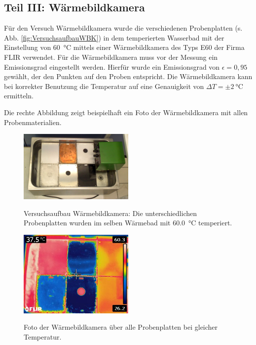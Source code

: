 \subsection{Teil III: Wärmebildkamera}

Für den Versuch Wärmebildkamera wurde die verschiedenen Probenplatten (s. Abb. \ref{fig:VersuchsaufbauWBK}) in dem temperierten Wasserbad mit der Einstellung von \SI{60}{\celsius} mittels einer Wärmebildkamera des Typs E60 der Firma FLIR verwendet. Für die Wärmebildkamera muss vor der Messung ein Emissionsgrad eingestellt werden. Hierfür wurde ein Emissionsgrad von $\epsilon=0,95$ gewählt, der den Punkten auf den Proben entspricht. Die Wärmebildkamera kann bei korrekter Benutzung die Temperatur auf eine Genauigkeit von $\Delta T = \pm \SI{2}{\celsius}$ ermitteln.

Die rechte Abbildung zeigt beispielhaft ein Foto der Wärmebildkamera mit allen Probenmaterialien. 

\begin{figure}[H]
	\begin{minipage}{0.5\textwidth}
		\centering
		\includegraphics[width=0.5\textwidth]{../FLIR_100/FLIR2240.jpg}
		\caption{\textwidth}{Versuchsaufbau Wärmebildkamera: Die unterschiedlichen Probenplatten wurden im selben Wärmebad mit \SI{60,0}{\celsius} temperiert.}
		\label{fig:VersuchsaufbauWBK}
	\end{minipage}
	\begin{minipage}{0.5\textwidth}
		\centering
		\includegraphics[width=0.5\textwidth]{../FLIR_100/FLIR2241.jpg}
		\caption{\textwidth}{Foto der Wärmebildkamera über alle Probenplatten bei gleicher Temperatur.}
		\label{fig:FotoWBK}
	\end{minipage}
\end{figure}

